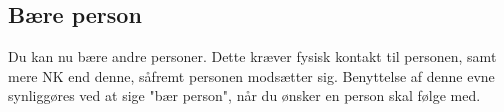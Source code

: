 \subsection*{Bære person}
Du kan nu bære andre personer. Dette kræver fysisk kontakt til personen, samt mere NK end denne, såfremt personen modsætter sig. Benyttelse af denne evne synliggøres ved at sige "bær person", når du ønsker en person skal følge med.\\